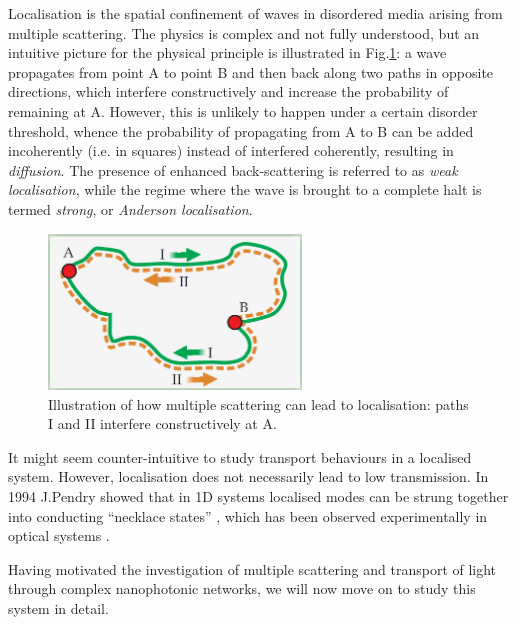 Localisation is the spatial confinement of waves in disordered media arising from multiple scattering. The physics is complex and not fully understood, but an intuitive picture for the physical principle is illustrated in Fig.\ref{fig:multiple_scattering}: a wave propagates from point A to point B and then back along two paths in opposite directions, which interfere constructively and increase the probability of remaining at A. However, this is unlikely to happen under a certain disorder threshold, whence the probability of propagating from A to B can be added incoherently (i.e. in squares) instead of interfered coherently, resulting in \textit{diffusion}. The presence of enhanced back-scattering is referred to as \textit{weak localisation}, while the regime where the wave is brought to a complete halt is termed \textit{strong}, or \textit{Anderson localisation}. \cite{Lagendijk2009}

\begin{figure}[h]
  \centering
    \includegraphics[width=0.6\textwidth]{ch1/fig1/multiple_scattering}
    \caption{Illustration of how multiple scattering can lead to localisation: paths I and II interfere constructively at A. \cite{Lagendijk2009}}
    \label{fig:multiple_scattering}
\end{figure}

It might seem counter-intuitive to study transport behaviours in a localised system. However, localisation does not necessarily lead to low transmission. In 1994 J.Pendry showed that in 1D systems localised modes can be strung together into conducting ``necklace states'' \cite{Pendry1994}, which has been observed experimentally in optical systems \cite{Bertolotti2005}.

Having motivated the investigation of multiple scattering and transport of light through complex nanophotonic networks, we will now move on to study this system in detail.




